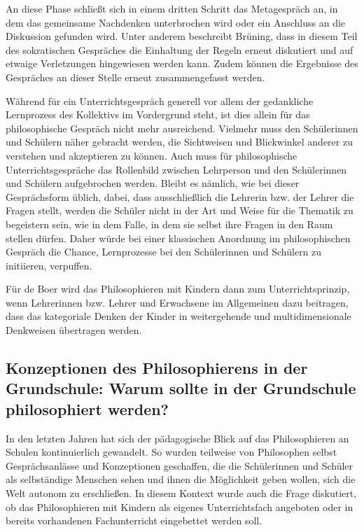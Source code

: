 An diese Phase schließt sich in einem dritten Schritt das Metagespräch an, in  dem das gemeinsame Nachdenken unterbrochen wird oder ein Anschluss an die Diskussion gefunden wird. 
Unter anderem beschreibt Brüning, dass in diesem Teil des sokratischen Gespräches die Einhaltung der Regeln erneut diskutiert und auf etwaige Verletzungen hingewiesen werden kann. 
Zudem können die Ergebnisse des Gespräches an dieser Stelle erneut zusammengefasst werden.

Während für ein Unterrichtsgespräch generell vor allem der gedankliche Lernprozess des Kollektivs im Vordergrund steht, ist dies allein für das philosophische Gespräch nicht mehr ausreichend. 
Vielmehr muss den Schülerinnen und Schülern näher gebracht werden, die Sichtweisen und Blickwinkel anderer zu verstehen und akzeptieren zu können\cite{HDB15}. 
Auch muss für philosophische Unterrichtsgespräche das Rollenbild zwischen Lehrperson und den Schülerinnen und Schülern aufgebrochen werden. 
Bleibt es nämlich, wie bei dieser Gesprächsform üblich, dabei, dass ausschließlich die Lehrerin bzw. der Lehrer die Fragen stellt, werden die Schüler nicht in der Art und Weise für die Thematik zu begeistern sein, wie in dem Falle, in dem sie selbst ihre Fragen in den Raum stellen dürfen. 
Daher würde bei einer klassischen Anordnung im philosophischen Gespräch die Chance, Lernprozesse bei den Schülerinnen und Schülern zu initiieren, verpuffen.

Für de Boer wird das Philosophieren mit Kindern dann zum Unterrichtsprinzip, wenn Lehrerinnen bzw. Lehrer und Erwachsene im Allgemeinen dazu beitragen, dass das kategoriale Denken der Kinder in weitergehende und multidimensionale Denkweisen übertragen werden.


\newpage
\subsection{Konzeptionen des Philosophierens in der Grundschule: Warum sollte in der Grundschule philosophiert werden?}

In den letzten Jahren hat sich der pädagogische Blick auf das Philosophieren an Schulen kontinuierlich gewandelt. 
So wurden teilweise von Philosophen selbst Gesprächsanlässe und Konzeptionen geschaffen, die die Schülerinnen und Schüler als selbständige Menschen sehen und ihnen die Möglichkeit geben wollen, sich die Welt autonom zu erschließen\cite{AN13, S.617}. 
In diesem Kontext wurde auch die Frage diskutiert, ob das Philosophieren mit Kindern als eigenes Unterrichtsfach angeboten oder in bereits vorhandenen Fachunterricht eingebettet werden soll. 

